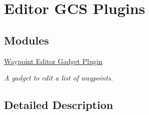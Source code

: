 \hypertarget{group___waypoint}{\section{Editor G\-C\-S Plugins}
\label{group___waypoint}
}
\subsection*{Modules}
\begin{DoxyCompactItemize}
\item 
\hyperlink{group___waypoint_editor_gadget_plugin}{Waypoint Editor Gadget Plugin}
\begin{DoxyCompactList}\small\item\em A gadget to edit a list of waypoints. \end{DoxyCompactList}\end{DoxyCompactItemize}


\subsection{Detailed Description}
